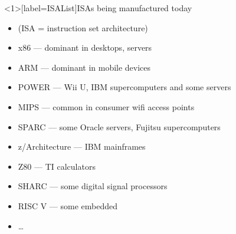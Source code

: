 {
\begin{frame}<1>[label=ISAList]{ISAs being manufactured today}
    \begin{itemize}
        \item {\small (ISA = instruction set architecture)}
        \item x86 --- dominant in desktops, servers
        \item ARM --- dominant in mobile devices
        \item POWER --- Wii U, IBM supercomputers and some servers
        \item MIPS --- common in consumer wifi access points
        \item SPARC --- some Oracle servers, Fujitsu supercomputers
        \item z/Architecture --- IBM mainframes
        \item Z80 --- TI calculators
        \item SHARC --- some digital signal processors 
        \item RISC V --- some embedded
        \item \ldots{}
    \end{itemize}
\end{frame}
}

